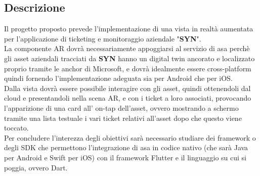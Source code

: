 \subsection{Descrizione}
Il progetto proposto prevede l'implementazione di una vista in realtà aumentata per l'applicazione di ticketing e monitoraggio aziendale "\textbf{SYN}".\\
La componente AR dovrà necessariamente appoggiarsi al servizio di \gls{asa} perchè gli \gls{asset} aziendali tracciati da \textbf{SYN} hanno un \gls{digital twin} ancorato e localizzato proprio tramite le \gls{anchor} di Microsoft, e dovrà idealmente essere cross-platform quindi fornendo l'implementazione adeguata sia per Android che per iOS.\\
Dalla vista dovrà essere possibile interagire con gli \gls{asset}, quindi ottenendoli dal cloud e presentandoli nella scena AR, e con i ticket a loro associati, provocando l'apparizione di una card all' on-tap dell'\gls{asset}, ovvero mostrando a schermo tramite una lista testuale i vari ticket relativi all'\gls{asset} dopo che questo viene toccato.\\
Per concludere l'interezza degli obiettivi sarà necessario studiare dei \gls{framework} o degli \gls{SDK} che permettono l'integrazione di \gls{asa} in codice nativo (che sarà Java per Android e Swift per iOS) con il \gls{framework} Flutter e il linguaggio su cui si poggia, ovvero Dart.


